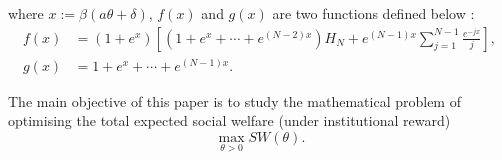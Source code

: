 \documentclass{article}
\begin{document}
where $x:=\beta(a\theta + \delta)$, $f(x)$ and $g(x)$ are two functions defined below \cite{duonghan2021cost}: 
\begin{align}
f(x) &= (1 + e^x)\left[ \left(1 + e^x + \cdots + e^{(N-2)x}\right) H_N 
+ e^{(N-1)x} \sum_{j=1}^{N-1} \frac{e^{-jx}}{j} \right] \label{fx}, \\
g(x) &= 1 + e^x + \cdots + e^{(N-1)x}. \label{gx}
\end{align}


The main objective of this paper is to study the mathematical problem of optimising the total expected social welfare (under institutional reward)
\begin{equation}
 \label{eq: max SW} \max_{\theta>0}SW(\theta).  
\end{equation}
\end{document}
